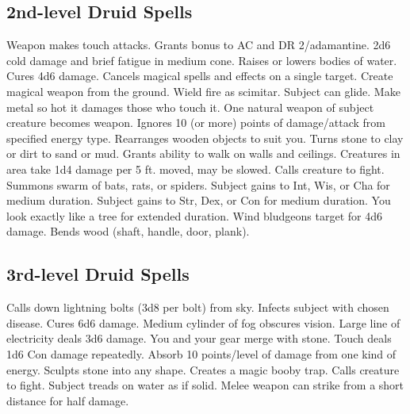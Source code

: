 \subsection{2nd-level Druid Spells}
\begin{spelllist}
   Weapon makes touch attacks. 
   Grants  bonus to AC and DR 2/adamantine.
   2d6 cold damage and brief fatigue in medium cone.
   Raises or lowers bodies of water.
   Cures 4d6 damage.
   Cancels magical spells and effects on a single target.
   Create magical weapon from the ground.
   Wield fire as scimitar.
   Subject can glide.
   Make metal so hot it damages those who touch it.
   One natural weapon of subject creature becomes  weapon.
   Ignores 10 (or more) points of damage/attack from specified energy type.
   Rearranges wooden objects to suit you.
   Turns stone to clay or dirt to sand or mud.
   Grants ability to walk on walls and ceilings.
   Creatures in area take 1d4 damage per 5 ft. moved, may be slowed.
   Calls creature to fight.
   Summons swarm of bats, rats, or spiders.
   Subject gains  to Int, Wis, or Cha for medium duration.
   Subject gains  to Str, Dex, or Con for medium duration.
   You look exactly like a tree for extended duration.
   Wind bludgeons target for 4d6 damage.
   Bends wood (shaft, handle, door, plank).
\end{spelllist}

\subsection{3rd-level Druid Spells}
\begin{spelllist}
   Calls down lightning bolts (3d8 per bolt) from sky.
   Infects subject with chosen disease.
   Cures 6d6 damage.
   Medium cylinder of fog obscures vision.
   Large line of electricity deals 3d6 damage.
   You and your gear merge with stone.
   Touch deals 1d6 Con damage repeatedly.
   Absorb 10 points/level of damage from one kind of energy.
   Sculpts stone into any shape.
   Creates a magic booby trap.
   Calls creature to fight.
   Subject treads on water as if solid.
   Melee weapon can strike from a short distance for half damage.
\end{spelllist}

